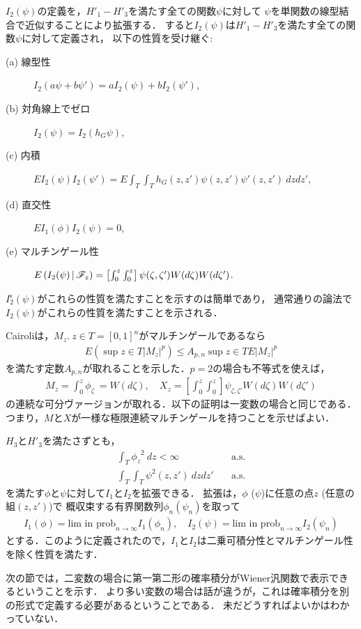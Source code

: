 	$I_{2}(\psi)$の定義を，$H'_{1}-H'_{3}$を満たす全ての関数$\psi$に対して
	$\psi$を単関数の線型結合で近似することにより拡張する．
	すると$I_{2}(\psi)$は$H'_{1}-H'_{3}$を満たす全ての関数$\psi$に対して定義され，
	以下の性質を受け継ぐ:
	\begin{description}
		\item[(a) 線型性] $I_{2}(a \psi + b \psi') = aI_{2}(\psi) + bI_{2}(\psi')$,
		\item[(b) 対角線上でゼロ] $I_{2}(\psi) = I_{2}(h_{G}\psi)$,
		\item[(c) 内積] $EI_{2}(\psi)I_{2}(\psi') = 
			E\int_{T}\int_{T} h_{G}(z,z') \psi(z,z') \psi'(z,z')\ dzdz'$,
		\item[(d) 直交性] $EI_{1}(\phi)I_{2}(\psi) = 0$,
		\item[(e) マルチンゲール性] $E\left( I_{2}(\psi) \, \middle|\, \mathscr{F}_{z} \right)
			= \left[\int_{0}^{z} \int_{0}^{z}\right] \psi(\zeta,\zeta')
			W(d\zeta) W(d\zeta')$.
	\end{description}
	$I^{\epsilon}_{2}(\psi)$がこれらの性質を満たすことを示すのは簡単であり，
	通常通りの論法で$I_{2}(\psi)$がこれらの性質を満たすことを示される．
	
	Cairoliは，$M_{z}.\ z \in T = [0,1]^{n}$がマルチンゲールであるなら
	\begin{align}
		E\left(\sup{z \in T}{|M_{z}|^{p}}\right)
		\leq A_{p,n} \sup{z \in T}{E|M_{z}|^{p}}
	\end{align}
	を満たす定数$A_{p,n}$が取れることを示した．$p=2$の場合も不等式を使えば，
	\begin{align}
		M_{z} = \int_{0}^{z} \phi_{\zeta}\ = W(d\zeta),
		\quad X_{z} = \left[\int_{0}^{z} \int_{0}^{z}\right]
		\psi_{\zeta,\zeta'} W(d\zeta) W(d\zeta')
	\end{align}
	の連続な可分ヴァージョンが取れる．以下の証明は一変数の場合と同じである．
	つまり，$M$と$X$が一様な極限連続マルチンゲールを持つことを示せばよい．
	
	$H_{3}$と$H'_{3}$を満たさずとも，
	\begin{align}
		\int_{T} {\phi_{z}}^{2}\ dz < \infty \quad & \mbox{a.s.} \\
		\int_{T} \int_{T} \psi^{2}(z,z')\ dzdz' \quad & \mbox{a.s.}
	\end{align}
	を満たす$\phi$と$\psi$に対して$I_{1}$と$I_{2}$を拡張できる．
	拡張は，$\phi$ ($\psi$)に任意の点$z$ (任意の組$(z,z')$)で
	概収束する有界関数列$\phi_{n} (\psi_{n})$を取って 
	\begin{align}
		I_{1}(\phi) = \mbox{lim in prob}_{n \to \infty} I_{1}(\phi_{n}),
		\quad I_{2}(\psi) = \mbox{lim in prob}_{n \to \infty} I_{2}(\psi_{n})
	\end{align}
	とする．このように定義されたので，$I_{1}$と$I_{2}$は二乗可積分性とマルチンゲール性を除く性質を満たす．
	
	次の節では，二変数の場合に第一第二形の確率積分がWiener汎関数で表示できるということを示す．
	より多い変数の場合は話が違うが，これは確率積分を別の形式で定義する必要があるということである．
	未だどうすればよいかはわかっていない．